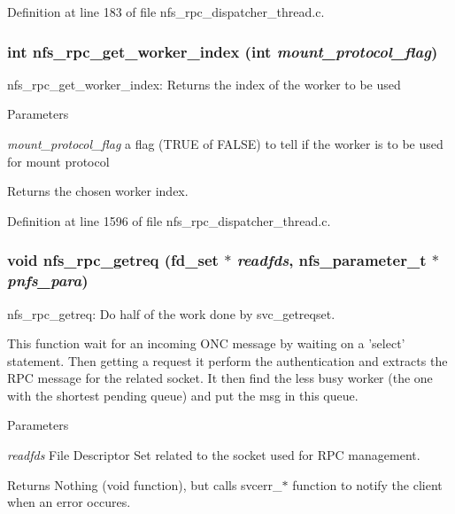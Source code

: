 Definition at line 183 of file nfs\_\-rpc\_\-dispatcher\_\-thread.c.
\subsubsection[{nfs\_\-rpc\_\-get\_\-worker\_\-index}]{\setlength{\rightskip}{0pt plus 5cm}int nfs\_\-rpc\_\-get\_\-worker\_\-index (int {\em mount\_\-protocol\_\-flag})}\label{nfs__rpc__dispatcher__thread_8c_aa3184c183d980c407420c2157f36c390}
nfs\_\-rpc\_\-get\_\-worker\_\-index: Returns the index of the worker to be used


\begin{DoxyParams}{Parameters}
\item[{\em mount\_\-protocol\_\-flag}]a flag (TRUE of FALSE) to tell if the worker is to be used for mount protocol\end{DoxyParams}
\begin{DoxyReturn}{Returns}
the chosen worker index. 
\end{DoxyReturn}


Definition at line 1596 of file nfs\_\-rpc\_\-dispatcher\_\-thread.c.
\subsubsection[{nfs\_\-rpc\_\-getreq}]{\setlength{\rightskip}{0pt plus 5cm}void nfs\_\-rpc\_\-getreq (fd\_\-set $\ast$ {\em readfds}, \/  nfs\_\-parameter\_\-t $\ast$ {\em pnfs\_\-para})}\label{nfs__rpc__dispatcher__thread_8c_a0785e886197e39cc730793e0988d02ce}
nfs\_\-rpc\_\-getreq: Do half of the work done by svc\_\-getreqset.

This function wait for an incoming ONC message by waiting on a 'select' statement. Then getting a request it perform the authentication and extracts the RPC message for the related socket. It then find the less busy worker (the one with the shortest pending queue) and put the msg in this queue.


\begin{DoxyParams}{Parameters}
\item[{\em readfds}]File Descriptor Set related to the socket used for RPC management.\end{DoxyParams}
\begin{DoxyReturn}{Returns}
Nothing (void function), but calls svcerr\_\-$\ast$ function to notify the client when an error occures. 
\end{DoxyReturn}


